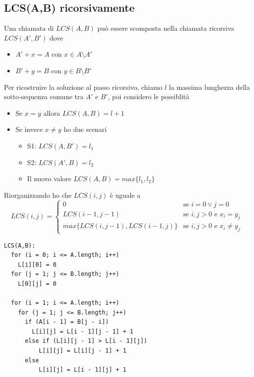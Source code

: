 \documentclass{article}
\begin{document}
\subsection*{LCS(A,B) ricorsivamente}
Una chiamata di \(LCS(A,B)\) può essere scomposta nella chiamata ricorsiva \(LCS(A',B')\) dove
\begin{itemize}
  \item \(A' + x = A\) con \(x \in A \setminus A'\)
  \item \(B' + y = B\) con \(y \in B \setminus B'\)
\end{itemize}
Per ricostruire la soluzione al passo ricorsivo, chiamo \(l\) la massima lunghezza della sotto-sequenza comune tra \(A'\) e \(B'\), poi considero le possiblità
\begin{itemize}
  \item Se \(x = y\) allora \(LCS(A,B) = l + 1\)
  \item Se invece \(x \neq y\) ho due scenari
        \begin{itemize}
          \item S1: \(LCS(A, B') = l_1\)
          \item S2: \(LCS(A', B) = l_2\)
          \item Il nuovo valore \(LCS(A,B) = max\{l_1, l_2\}\)
        \end{itemize}
\end{itemize}
Riorganizzando ho che \(LCS(i,j)\) è uguale a
\begin{equation*}
  LCS(i,j) =
  \begin{cases}
    0                                   & \text{se } i = 0 \lor j = 0                \\
    LCS(i - 1, j - 1)                   & \text{se } i,j > 0 \text{ e } x_i = y_j    \\
    max\{LCS(i, j - 1), LCS(i - 1, j)\} & \text{se } i,j > 0 \text{ e } x_i \neq y_j
  \end{cases}
\end{equation*}

\begin{lstlisting}
LCS(A,B):
  for (i = 0; i <= A.length; i++)
    L[i][0] = 0
  for (j = 1; j <= B.length; j++)
    L[0][j] = 0

  for (i = 1; i <= A.length; i++)
    for (j = 1; j <= B.length; j++)
      if (A[i - 1] = B[j - i])
        L[i][j] = L[i - 1][j - 1] + 1
      else if (L[i][j - 1] > L[i - 1][j])
          L[i][j] = L[i][j - 1] + 1
      else 
          L[i][j] = L[i - 1][j] + 1
\end{lstlisting}
\end{document}
